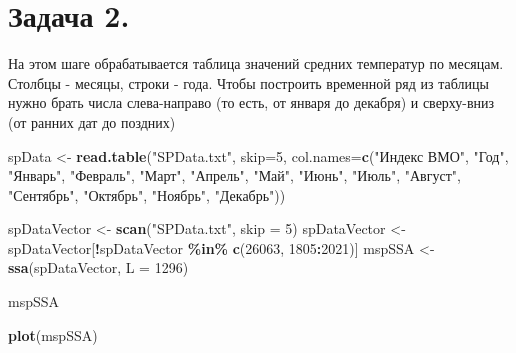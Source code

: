 \documentclass[
]{article}
\newenvironment{Shaded}{\begin{snugshade}}{\end{snugshade}}
\newcommand{\AttributeTok}[1]{\textcolor[rgb]{0.13,0.29,0.53}{#1}}
\newcommand{\DecValTok}[1]{\textcolor[rgb]{0.00,0.00,0.81}{#1}}
\newcommand{\FunctionTok}[1]{\textcolor[rgb]{0.13,0.29,0.53}{\textbf{#1}}}
\newcommand{\NormalTok}[1]{#1}
\newcommand{\OtherTok}[1]{\textcolor[rgb]{0.56,0.35,0.01}{#1}}
\newcommand{\SpecialCharTok}[1]{\textcolor[rgb]{0.81,0.36,0.00}{\textbf{#1}}}
\newcommand{\StringTok}[1]{\textcolor[rgb]{0.31,0.60,0.02}{#1}}
\begin{document}
\section{Задача 2.}\label{ux437ux430ux434ux430ux447ux430-2.}

На этом шаге обрабатывается таблица значений средних температур по
месяцам. Столбцы - месяцы, строки - года. Чтобы построить временной ряд
из таблицы нужно брать числа слева-направо (то есть, от января до
декабря) и сверху-вниз (от ранних дат до поздних)

\begin{Shaded}
\begin{Highlighting}[]
\NormalTok{spData }\OtherTok{\textless{}{-}} \FunctionTok{read.table}\NormalTok{(}\StringTok{"SPData.txt"}\NormalTok{, }\AttributeTok{skip=}\DecValTok{5}\NormalTok{, }\AttributeTok{col.names=}\FunctionTok{c}\NormalTok{(}\StringTok{"Индекс ВМО"}\NormalTok{, }\StringTok{"Год"}\NormalTok{, }\StringTok{"Январь"}\NormalTok{,}
                                                       \StringTok{"Февраль"}\NormalTok{, }\StringTok{"Март"}\NormalTok{, }\StringTok{"Апрель"}\NormalTok{,}
                                                       \StringTok{"Май"}\NormalTok{, }\StringTok{"Июнь"}\NormalTok{, }\StringTok{"Июль"}\NormalTok{, }\StringTok{"Август"}\NormalTok{,}
                                                       \StringTok{"Сентябрь"}\NormalTok{, }\StringTok{"Октябрь"}\NormalTok{, }\StringTok{"Ноябрь"}\NormalTok{,}
                                                       \StringTok{"Декабрь"}\NormalTok{)) }


\NormalTok{spDataVector }\OtherTok{\textless{}{-}} \FunctionTok{scan}\NormalTok{(}\StringTok{"SPData.txt"}\NormalTok{, }\AttributeTok{skip =} \DecValTok{5}\NormalTok{)}
\NormalTok{spDataVector }\OtherTok{\textless{}{-}}\NormalTok{ spDataVector[}\SpecialCharTok{!}\NormalTok{spDataVector }\SpecialCharTok{\%in\%} \FunctionTok{c}\NormalTok{(}\DecValTok{26063}\NormalTok{, }\DecValTok{1805}\SpecialCharTok{:}\DecValTok{2021}\NormalTok{)]}
\NormalTok{mspSSA }\OtherTok{\textless{}{-}} \FunctionTok{ssa}\NormalTok{(spDataVector, }\AttributeTok{L =} \DecValTok{1296}\NormalTok{)}
\end{Highlighting}
\end{Shaded}

mspSSA

\begin{Shaded}
\begin{Highlighting}[]
\FunctionTok{plot}\NormalTok{(mspSSA)}
\end{Highlighting}
\end{Shaded}
\end{document}
